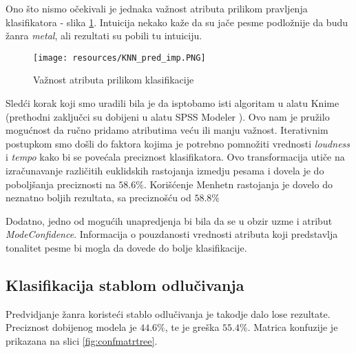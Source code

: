 Ono \v{s}to nismo o\v{c}ekivali je jednaka va\v{z}nost atributa prilikom pravljenja klasifikatora - slika \ref{fig:KNNvaznost}. Intuicija nekako ka\v{z}e da su ja\v{c}e pesme podlo\v{z}nije da budu \v{z}anra \emph{metal}, ali rezultati su pobili tu intuiciju.

\begin{figure}[H]
    \centering
    \texttt{[image: resources/KNN\_pred\_imp.PNG]}
    \caption{Va\v{z}nost atributa prilikom klasifikacije}
    \label{fig:KNNvaznost}
\end{figure}

Sled\'c{}i korak koji smo uradili bila je da isptobamo isti algoritam u alatu Knime \cite{KNIME} (prethodni zaklju\v{c}ci su dobijeni u alatu SPSS Modeler \cite{SPSS}). Ovo nam je pru\v{z}ilo mogu\'c{}nost da ru\v{c}no pridamo atributima ve\'c{}u ili manju va\v{z}nost. Iterativnim postupkom smo do\v{s}li do faktora kojima je potrebno pomno\v{z}iti vrednosti \emph{loudness} i \emph{tempo} kako bi se pove\'c{}ala preciznost klasifikatora. Ovo transformacija uti\v{c}e na izra\v{c}unavanje razli\v{c}itih euklidskih rastojanja izmedju pesama i dovela je do pobolj\v{s}anja preciznosti na $58.6\%$. Kori\v{s}\'c{}enje Menhetn rastojanja je dovelo do neznatno boljih rezultata, sa precizno\v{s}\'c{}u od $58.8\%$

Dodatno, jedno od mogu\'c{}ih unapredjenja bi bila da se u obzir uzme i atribut \emph{ModeConfidence}. Informacija o pouzdanosti vrednosti atributa koji predstavlja tonalitet pesme bi mogla da dovede do bolje klasifikacije.

\subsection{Klasifikacija stablom odlu\v{c}ivanja}
\label{subsec:stablo}
Predvidjanje \v{z}anra koriste\'c{}i stablo odlu\v{c}ivanja je takodje dalo lose rezultate. Preciznost dobijenog modela je $44.6\%$, te je gre\v{s}ka $55.4\%$. Matrica konfuzije je prikazana na slici \ref{fig:confmatrtree}.

